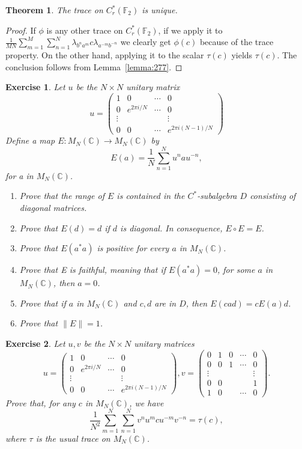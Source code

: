 \documentclass{book}
\newtheorem{exercise}{Exercise}[section]
\newtheorem{theorem}[definition]{Theorem}
\begin{document}
\begin{theorem}\label{theorem:273}
  The trace on \(C^*_r(\mathbb{F}_2)\) is unique.
\end{theorem}
\begin{proof}
  If \(\phi\) is any other trace on \(C^*_r(\mathbb{F}_2)\), if
  we apply it to \(\frac{1}{MN} \sum^M_{m=1}\sum^N_{n=1}  \lambda_{b^n a^m} c \lambda_{a^{-m}b^{-n}}\) 
  we clearly get \(\phi(c)\) because of
  the trace property. On the other hand, applying it to the scalar \(\tau(c)\) yields
  \(\tau(c)\). The conclusion follows from Lemma~\ref{lemma:277}.
\end{proof}
\begin{exercise}
  Let \(u\) be the \(N\times N\) unitary matrix
  \[
    u=
    \begin{pmatrix}
      1 &0 &\cdots &0\\
      0 &e^{2\pi i/N} &\cdots &0\\
      \vdots&&& \vdots\\
      0 &0 &\cdots &e^{2\pi i(N-1)/N}
  \end{pmatrix}
  \]
  Define a map \(E:M_N(\mathbb{C})\rightarrow M_N(\mathbb{C})\) by
  \[E(a)= \frac{1}{N} \sum^N_{n=1} u^n au^{-n},\]
  for a in \(M_N(\mathbb{C})\).
  \begin{enumerate}
    \item Prove that the range of \(E\) is contained in the \(C^*\)-subalgebra \(D\) consisting
    of diagonal matrices.
    \item Prove that \(E(d)=d\) if \(d\) is diagonal. In consequence, \(E\circ E=E\).
    \item Prove that \(E(a^*a)\) is positive for every \(a\) in \(M_N(\mathbb{C})\).
    \item Prove that E is faithful, meaning that if \(E(a^*a)=0\), for some \(a\) in
    \(M_N(\mathbb{C})\), then \(a=0\).
    \item Prove that if \(a\) in \(M_N(\mathbb{C})\) and \(c,d\) are in \(D\), then \(E(cad)=cE(a)d\).
    \item Prove that \(\|E\| =1\).
  \end{enumerate}
\end{exercise}
\begin{exercise}
  Let \(u,v\) be the \(N\times N\) unitary matrices
  \[
    u=
    \begin{pmatrix}
      1 &0 &\cdots &0\\
      0 &e^{2\pi i/N} &\cdots &0\\
      \vdots&&& \vdots\\
      0 &0 &\cdots &e^{2\pi i(N-1)/N}
    \end{pmatrix},v=
    \begin{pmatrix}
      0 &1 &0 &\cdots& 0\\
      0 &0 &1 &\cdots& 0\\
      \vdots & & & &\vdots\\
      0 &0 & & &1\\
      1 &0 & &\cdots &0
    \end{pmatrix}.
  \]
  Prove that, for any \(c\) in \(M_N(\mathbb{C})\), we have
  \[\frac{1}{N^2}\sum^N_{m=1}\sum^N_{n=1}v^n u^m cu^{-m}v^{-n}=\tau(c),\]
  where \(\tau\) is the usual trace on \(M_N(\mathbb{C})\).
\end{exercise}
\end{document}

